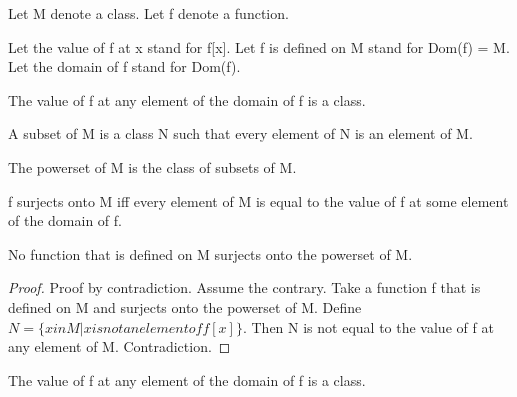 \documentclass[a4paper,draft]{amsproc}
\begin{document}
\begin{forthel}

Let M denote a class.
Let f denote a function.

Let the value of f at x stand for f[x].
Let f is defined on M stand for Dom(f) = M.
Let the domain of f stand for Dom(f).


\begin{axiom}
The value of f at any element of the domain of f is a class.
\end{axiom}

\begin{definition}[subset]
A subset of M is a class N such that every element of N is an element of M.
\end{definition}

\begin{definition}
The powerset of M is the class of subsets of M.
\end{definition}

\begin{definition}
f surjects onto M iff every element of M is equal to the value of f at some element of the domain of f.
\end{definition}

\begin{proposition}
No function that is defined on M surjects onto the powerset of M.
\end{proposition}
\begin{proof}
Proof by contradiction.
Assume the contrary. Take a function f that is defined on M and surjects onto the powerset of M.
Define $N = \{ x in M | x is not an element of f[x] \}$.
Then N is not equal to the value of f at any element of M.
Contradiction.
\end{proof}

\begin{theorem}
The value of f at any element of the domain of f is a class.
\end{theorem}

\end{forthel}
\end{document}

